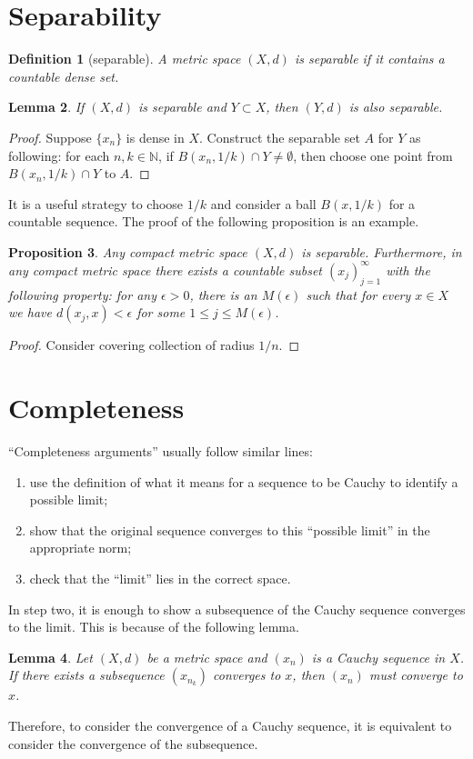\documentclass[12pt,a4paper]{article}
\numberwithin{equation}{section}
\theoremstyle{mystyle}
\newtheorem{definition}{Definition}[section]
\newtheorem{lemma}[definition]{Lemma}
\newtheorem{proposition}[definition]{Proposition}
\newcommand{\N}{\mathbb{N}}
\begin{document}
	\section{Separability}
	\begin{definition}[separable]
		A metric space $(X,d)$ is \emph{separable} if it contains a countable dense set.
	\end{definition}
	\begin{lemma}
		If $(X,d)$ is separable and $Y\subset X$, then $(Y,d)$ is also separable. 
	\end{lemma}
	\begin{proof}
		Suppose $\{x_n\}$ is dense in $X$. Construct the separable set $A$ for $Y$ as following: for each $n,k\in \N$, if $B(x_n,1/k)\cap Y\neq \emptyset$, then choose one point from $B(x_n,1/k)\cap Y$ to $A$.
	\end{proof}
	It is a useful strategy to choose $1/k$ and consider a ball $B(x,1/k)$ for a countable sequence. The proof of the following proposition is an example.
	\begin{proposition}
		Any compact metric space $(X,d)$ is separable. Furthermore, in any compact metric space there exists a countable subset $(x_j)_{j=1}^\infty$ with the following property: for any $\epsilon>0$, there is an $M(\epsilon)$ such that for every $x\in X$ we have $d(x_j,x)<\epsilon$ for some $1\leq j \leq M(\epsilon)$.
	\end{proposition}
	\begin{proof}
		Consider covering collection of radius $1/n$.
	\end{proof}
	
	
	\section{Completeness}
	``Completeness arguments'' usually follow similar lines:
	\begin{enumerate}
		\item use the definition of what it means for a sequence to be Cauchy to identify a possible limit;
		\item show that the original sequence converges to this ``possible limit'' in the appropriate norm;
		\item check that the ``limit'' lies in the correct space.
	\end{enumerate}
	In step two, it is enough to show a subsequence of the Cauchy sequence converges to the limit. This is because of the following lemma.
	\begin{lemma}
		Let $(X,d)$ be a metric space and $(x_n)$ is a Cauchy sequence in $X$. If there exists a subsequence $(x_{n_k})$ converges to $x$, then $(x_n)$ must converge to $x$.
	\end{lemma}
	Therefore, to consider the convergence of a Cauchy sequence, it is equivalent to consider the convergence of the subsequence.
\end{document}

